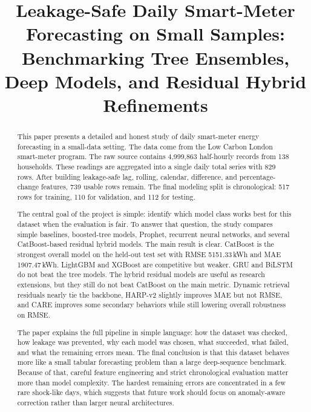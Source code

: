\documentclass[conference]{IEEEtran}
\begin{document}
\title{Leakage-Safe Daily Smart-Meter Forecasting on Small Samples:\\
Benchmarking Tree Ensembles, Deep Models, and Residual Hybrid Refinements}

\author{%
}

\maketitle

\begin{abstract}
This paper presents a detailed and honest study of daily smart-meter energy forecasting in a small-data setting. The data come from the Low Carbon London smart-meter program. The raw source contains 4,999,863 half-hourly records from 138 households. These readings are aggregated into a single daily total series with 829 rows. After building leakage-safe lag, rolling, calendar, difference, and percentage-change features, 739 usable rows remain. The final modeling split is chronological: 517 rows for training, 110 for validation, and 112 for testing.

The central goal of the project is simple: identify which model class works best for this dataset when the evaluation is fair. To answer that question, the study compares simple baselines, boosted-tree models, Prophet, recurrent neural networks, and several CatBoost-based residual hybrid models. The main result is clear. CatBoost is the strongest overall model on the held-out test set with RMSE 5151.33\,kWh and MAE 1907.47\,kWh. LightGBM and XGBoost are competitive but weaker. GRU and BiLSTM do not beat the tree models. The hybrid residual models are useful as research extensions, but they still do not beat CatBoost on the main metric. Dynamic retrieval residuals nearly tie the backbone, HARP-v2 slightly improves MAE but not RMSE, and CARE improves some secondary behaviors while still lowering overall robustness on RMSE.

The paper explains the full pipeline in simple language: how the dataset was checked, how leakage was prevented, why each model was chosen, what succeeded, what failed, and what the remaining errors mean. The final conclusion is that this dataset behaves more like a small tabular forecasting problem than a large deep-sequence benchmark. Because of that, careful feature engineering and strict chronological evaluation matter more than model complexity. The hardest remaining errors are concentrated in a few rare shock-like days, which suggests that future work should focus on anomaly-aware correction rather than larger neural architectures.
\end{abstract}
\end{document}

